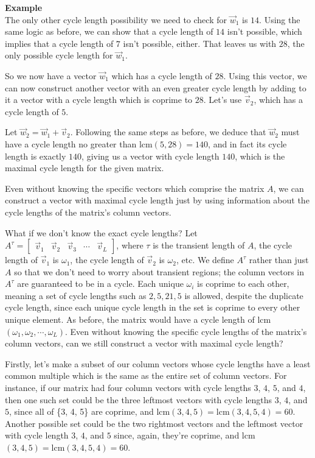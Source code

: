 \documentclass[a4paper, 12pt, reqno]{amsart}
\newcounter{mathexample}[section]
\newenvironment{mathexample}
{
	\refstepcounter{mathexample} %
	\textbf{Example \themathexample} 
	\\
}
{
	\vspace{1cm}
}
\begin{document}
\begin{mathexample}
		The only other cycle length possibility we need to check for $\vec{w}_{1}$ is $14$. Using
		the same logic as before, we can show that a cycle length of $14$ isn't possible, which
		implies that a cycle length of $7$ isn't possible, either. That leaves us with $28$, the
		only possible cycle length for $\vec{w}_{1}$.
		
		So we now have a vector $\vec{w}_{1}$ which has a cycle length of $28$. Using this
		vector, we can now construct another vector with an even greater cycle length by
		adding to it a vector with a cycle length which is coprime to $28$. Let's use $\vec{v}_{2}$,
		which has a cycle length of $5$.
		
		Let $\vec{w}_{2} = \vec{w}_{1} + \vec{v}_{2}$. Following the same steps as before, we deduce
		that $\vec{w}_{2}$ must have a cycle length no greater than lcm$(5, 28) = 140$, and in fact
		its cycle length is exactly $140$, giving us a vector with cycle length $140$, which is
		the maximal cycle length for the given matrix.
		
		Even without knowing the specific vectors which comprise the matrix $A$, we can construct a 
		vector with maximal cycle length just by using information about the cycle lengths of the
		matrix's column vectors.
	\end{mathexample}
	
	What if we don't know the exact cycle lengths? Let $A^\tau = 
		\begin{bmatrix}
			\vec{v}_{1} & \vec{v}_{2} & \vec{v}_{3} & \cdots & \vec{v}_{L}
		\end{bmatrix}
	$,
	where $\tau$ is the transient length of $A$, the cycle length of $\vec{v}_{1}$ is $\omega_{1}$, 
	the cycle length of $\vec{v}_{2}$ is $\omega_{2}$, etc. We define $A^\tau$ rather than just $A$ 
	so that we don't need to worry about transient regions; the column vectors in $A^\tau$ are guaranteed 
	to be in a cycle. Each unique $\omega_{i}$ is coprime to each other, meaning a set of cycle lengths 
	such as $2, 5, 21, 5$ is allowed, despite the duplicate cycle length, since each unique cycle length 
	in the set is coprime to every other unique element. As before, the matrix would have a cycle length 
	of lcm$(\omega_{1}, \omega_{2}, \cdots, \omega_{L})$. Even without knowing the specific cycle lengths 
	of the matrix's column vectors, can we still construct a vector with maximal cycle length?
	
	Firstly, let's make a subset of our column vectors whose cycle lengths have a least 
	common multiple which is the same as the entire set of column vectors. For instance, 
	if our matrix had four column vectors with cycle lengths $3$, $4$, $5$, and $4$, then 
	one such set could be the three leftmost vectors with cycle lengths $3$, $4$, and $5$, since 
	all of \{3, 4, 5\} are coprime, and lcm$(3, 4, 5) = \text{lcm}(3, 4, 5, 4) = 60$. Another 
	possible set could be the two rightmost vectors and the leftmost vector with cycle length $3$, 
	$4$, and $5$ since, again, they're coprime, and lcm$(3, 4, 5) = \text{lcm}(3, 4, 5, 4) = 60$.
	
\end{document}
